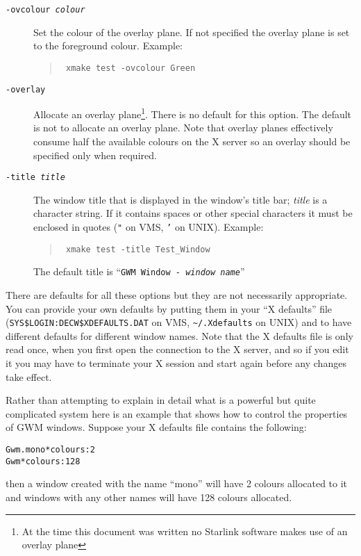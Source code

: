 \begin{description}
\item[\tt -ovcolour {\em colour}]
Set the colour of the overlay plane. If not specified the overlay plane is set
to the foreground colour. Example:
\begin{quote}\tt
xmake test -ovcolour Green
\end{quote}

\item[\tt -overlay] Allocate an overlay plane\footnote{At the time this 
document was 
written no Starlink software makes use of an overlay plane}.
There is no default for this option. The default is not to
allocate an overlay plane. Note that overlay planes effectively consume half
the available colours on the X server so an overlay should be specified only
when required.

\item[\tt -title {\em title}] The window title that is displayed in the
window's title bar;
{\em title} is a character string. If it contains spaces or other
special characters it must be enclosed in quotes ({\tt "} on VMS, {\tt '} on
UNIX). Example:
\begin{quote}\tt
xmake test -title Test\_Window
\end{quote}
The default title is ``{\tt GWM Window - {\em window name}}''

\end{description}

There are defaults for all these options but they are not necessarily
appropriate. You can provide your own defaults by putting
them in your ``X defaults'' file ({\tt SYS\$LOGIN:DECW\$XDEFAULTS.DAT} on VMS, 
{\tt\verb+~+/.Xdefaults} on UNIX) and to have different defaults for different
window names. Note that the X defaults file is only read once, when you first
open the connection to the X server, and so if you edit it you may have to 
terminate your X session and start again before any changes take effect.

Rather than attempting to explain in detail what is a powerful but quite
complicated system here is an example that shows how to control the properties
of GWM windows. Suppose your X defaults file contains the following:
\begin{tabbing}
\tt Gwm.mono*colours:\quad\=\tt 2\\
\tt Gwm*colours:\>\tt 128
\end{tabbing}
then a window created with the name ``mono'' will have 2 colours allocated to
it and windows with any other names will have 128 colours allocated.

